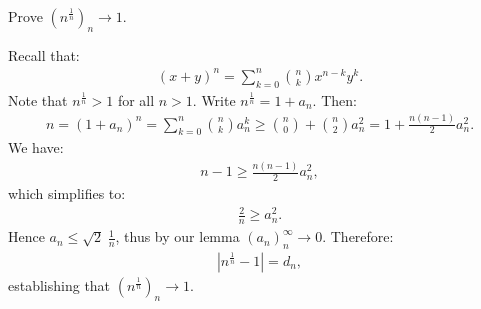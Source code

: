     \begin{example}
        Prove $(n^\frac{1}{n})_n \rightarrow 1$.
    \end{example}
        \begin{solution}
            Recall that:
                \begin{equation*}
                \begin{split}
                    (x+y)^n = \sum_{k=0}^n {n\choose k}x^{n-k}y^k.
                \end{split}
                \end{equation*}
            Note that $n^\frac{1}{n} > 1$ for all $n> 1$. Write $n^\frac{1}{n} = 1 + a_n$. Then:
                \begin{equation*}
                \begin{split}
                    n = (1+a_n)^n = \sum_{k=0}^n {n \choose k}a_n^k \geq {n \choose 0} + {n \choose 2}a_n^2 = 1 + \frac{n(n-1)}{2}a_n^2.
                \end{split}
                \end{equation*}
            We have:
                \begin{equation*}
                \begin{split}
                    n-1 \geq \frac{n(n-1)}{2}a_n^2,
                \end{split}
                \end{equation*}
            which simplifies to:
                \begin{equation*}
                \begin{split}
                    \frac{2}{n} \geq a_n^2.
                \end{split}
                \end{equation*}
            Hence $a_n \leq \sqrt{2} \hspace{3pt} \displaystyle{\frac{1}{n}}$, thus by our lemma $(a_n)_n^\infty \rightarrow 0$. Therefore:
                \begin{equation*}
                \begin{split}
                    |n^\frac{1}{n} - 1| = d_n,
                \end{split}
                \end{equation*}
            establishing that $(n^\frac{1}{n})_n \rightarrow 1$.
        \end{solution}

